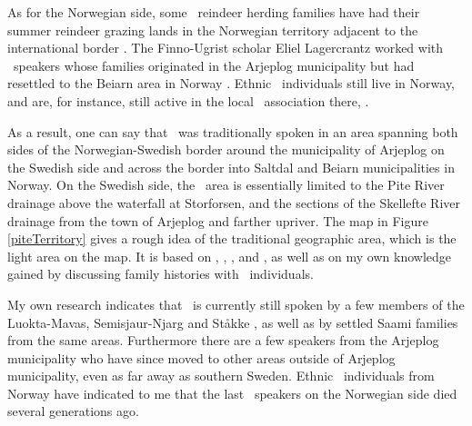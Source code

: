 As for the Norwegian side, some \PS\ reindeer herding families have had their summer reindeer grazing lands in the Norwegian territory adjacent to the international border \cite[cf.][]{Manker1947}. The Finno-Ugrist scholar Eliel Lagercrantz worked with \PS\ speakers whose families originated in the Arjeplog municipality but had resettled to the Beiarn area in Norway \cite[cf.][]{Lagercrantz1926}. Ethnic \PS\ individuals still live in Norway, and are, for instance, still active in the local \PS\ association there, . 

As a result, one can say that \PS\ was traditionally spoken in an area spanning both sides of the Norwegian-Swedish border around the municipality of Arjeplog on the Swedish side and across the border into Saltdal and Beiarn municipalities in Norway. %
On the Swedish side, the \PS\ area is essentially limited to the Pite River %
drainage above the waterfall at Storforsen, and the sections of the Skellefte River %
drainage from the town of Arjeplog and farther upriver. %
The map in Figure \vref{piteTerritory} gives a rough idea of the traditional geographic area, which is the light area on the map. It is based on  \citet{Lagercrantz1926}, \citet{Ruong1943}, \citet{Manker1947}, \citet{Bergsland1962} and \citet{Sammallahti1998}, as well as on my own knowledge gained by discussing family histories with \PS\ individuals.

My own research indicates that \PS\ is currently still spoken by a few members of the Luokta-Mavas, Semisjaur-Njarg and Ståkke , as well as by settled Saami families from the same areas. Furthermore there are a few speakers from the Arjeplog municipality who have since moved to other areas outside of Arjeplog municipality, %
even as far away as southern Sweden. %
Ethnic \PS\ individuals from Norway have indicated to me that the last \PS\ speakers on the Norwegian side died several generations ago.%

